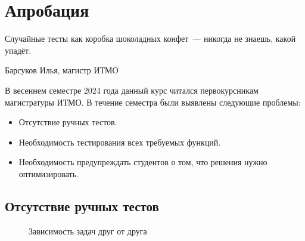 
\section{Апробация}

\epigraph{Случайные тесты как коробка шоколадных конфет~--- никогда не знаешь, какой упадёт.}{Барсуков Илья, магистр ИТМО}

В весеннем семестре 2024 года данный курс читался первокурсникам магистратуры ИТМО.
В течение семестра были выявлены следующие проблемы:
\begin{itemize}
    \item Отсутствие ручных тестов.
    \item Необходимость тестирования всех требуемых функций.
    \item Необходимость предупреждать студентов о том, что решения нужно оптимизировать.
\end{itemize}

\subsection{Отсутствие ручных тестов}

\begin{figure}[b]
    \caption{Зависимость задач друг от друга}
    \label{fig:dependencies}
    \centering
\end{figure}

